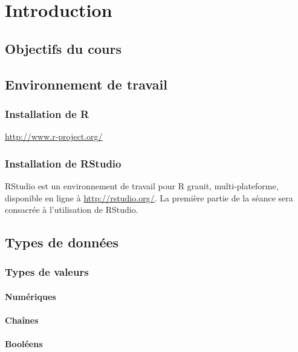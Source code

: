 \chapter{Introduction}

\section{Objectifs du cours}

\section{Environnement de travail}

\subsection{Installation de R}

\url{http://www.r-project.org/}

\subsection{Installation de RStudio}

RStudio est un environnement de travail pour R grauit, multi-plateforme, disponible en ligne à \url{http://rstudio.org/}.
La première partie de la séance sera consacrée à l'utilisation de RStudio.  

\section{Types de données}

\subsection{Types de valeurs}

\subsubsection{Numériques}

\subsubsection{Chaînes}

\subsubsection{Booléens}

